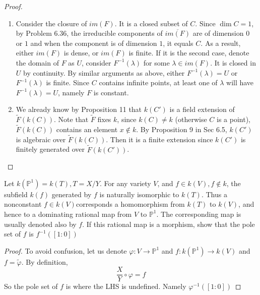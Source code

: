 \documentclass{solution}
\begin{document}
\begin{proof}
    \begin{enumerate}
        \item Consider the closure of $im(F)$. It is a closed subset of $C$. Since $\dim C = 1$, by Problem 6.36, the irreducible components of $\overline{im(F)}$ are of dimension $0$ or $1$ and when the component is of dimension $1$, it equals $C$. As a result, either $im(F)$ is dense, or $im(F)$ is finite. If it is the second case, denote the domain of $F$ as $U$, consider $F ^{-1} (\lambda)$ for some $\lambda \in im(F)$. It is closed in $U$ by continuity. By similar arguments as above, either $F ^{-1}(\lambda) = U$ or $F ^{-1}(\lambda)$ is finite. Since $C$ contains infinite points, at least one of $\lambda$ will have $F ^{-1}(\lambda) = U$, namely $F$ is constant.
        \item We already know by Proposition 11 that $k(C')$ is a field extension of $\tilde{F}(k(C))$. Note that $\tilde{F}$ fixes $k$, since $k(C) \ne k$ (otherwise $C$ is a point), $\tilde{F}(k(C))$ contains an element $x \notin k$. By Proposition 9 in Sec 6.5, $k(C')$ is algebraic over $\tilde{F}(k(C))$. Then it is a finite extension since $k(C')$ is finitely generated over $\tilde{F}(k(C'))$.
    \end{enumerate}
\end{proof}

\begin{problem}{6.46}
    Let $k(\mathbb{P}^1) = k(T), T = X / Y$. For any variety $V$, and $f \in k(V), f \notin k$, the subfield $k(f)$ generated by $f$ is naturally isomorphic to $k(T)$. Thus a nonconstant $f \in k(V)$corresponds a homomorphism from $k(T)$ to $k(V)$, and hence to a dominating rational map from $V$ to $\mathbb{P}^1$. The corresponding map is usually denoted also by $f$. If this rational map is a morphism, show that the pole set of $f$ is $f ^{-1}([1:0])$
\end{problem}

\begin{proof}
    To avoid confusion, let us denote $\varphi: V \rightarrow \mathbb{P}^1$ and $f: k(\mathbb{P}^1) \rightarrow k(V)$ and $f = \tilde{\varphi}$. By definition,
    $$\frac{X}{Y} \circ \varphi = f$$
    So the pole set of $f$ is where the LHS is undefined. Namely $\varphi ^{-1}([1:0])$
\end{proof}
\end{document}
